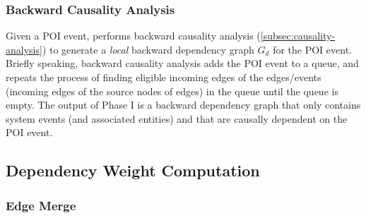 \subsubsection{Backward Causality Analysis}
\label{subsubsec:backward-causality}

Given a POI event, \tool performs backward causality analysis (\cref{subsec:causality-analysis}) to generate a \emph{local} backward dependency graph $G_d$ for the POI event.
%
Briefly speaking, backward causality analysis adds the POI event to a queue, and repeats the process of finding eligible incoming edges of the edges/events (\ie incoming edges of the source nodes of edges) in the queue until the queue is empty. 
The output of Phase I is a backward dependency graph that only contains system events (and associated entities) and that are causally dependent on the POI event.

%





\subsection{Dependency Weight Computation}
\label{subsec:phase2}

\subsubsection{Edge Merge}
\label{subsubsec:edge-merge}


